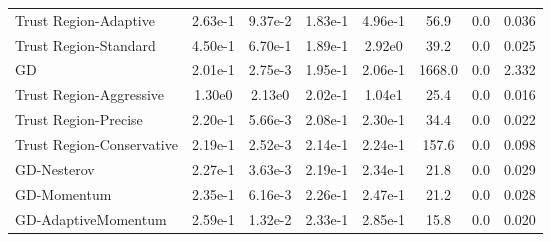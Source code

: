 \documentclass{article}
\begin{document}
\begin{table}[htbp]
{\begin{tabular}{p{2.5cm}*{7}{c}}
Trust Region-Adaptive & 2.63e-1 & 9.37e-2 & 1.83e-1 & 4.96e-1 & 56.9 & 0.0 & 0.036 \\
Trust Region-Standard & 4.50e-1 & 6.70e-1 & 1.89e-1 & 2.92e0 & 39.2 & 0.0 & 0.025 \\
GD & 2.01e-1 & 2.75e-3 & 1.95e-1 & 2.06e-1 & 1668.0 & 0.0 & 2.332 \\
Trust Region-Aggressive & 1.30e0 & 2.13e0 & 2.02e-1 & 1.04e1 & 25.4 & 0.0 & 0.016 \\
Trust Region-Precise & 2.20e-1 & 5.66e-3 & 2.08e-1 & 2.30e-1 & 34.4 & 0.0 & 0.022 \\
Trust Region-Conservative & 2.19e-1 & 2.52e-3 & 2.14e-1 & 2.24e-1 & 157.6 & 0.0 & 0.098 \\
GD-Nesterov & 2.27e-1 & 3.63e-3 & 2.19e-1 & 2.34e-1 & 21.8 & 0.0 & 0.029 \\
GD-Momentum & 2.35e-1 & 6.16e-3 & 2.26e-1 & 2.47e-1 & 21.2 & 0.0 & 0.028 \\
GD-AdaptiveMomentum & 2.59e-1 & 1.32e-2 & 2.33e-1 & 2.85e-1 & 15.8 & 0.0 & 0.020 \\
\bottomrule
\end{tabular}
}
\end{table}
\end{document}
